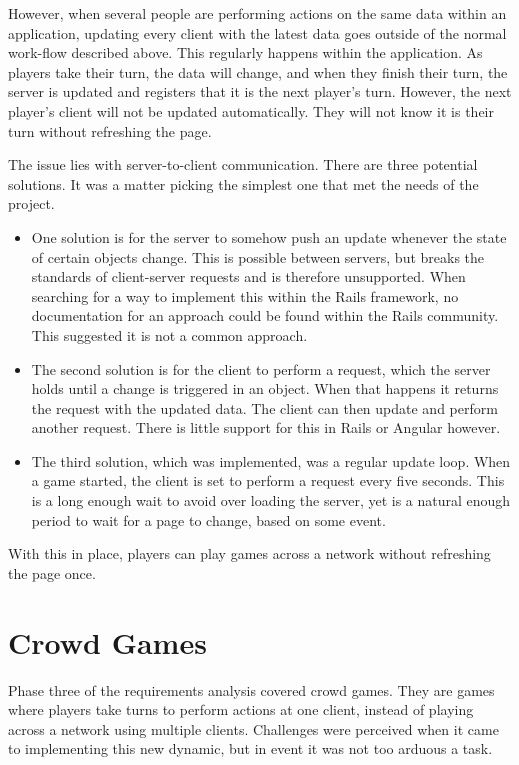 However, when several people are performing actions on the same data within an application, updating every client with the latest data goes outside of the normal work-flow described above. This regularly happens within the application. As players take their turn, the data will change, and when they finish their turn, the server is updated and registers that it is the next player's turn. However, the next player's client will not be updated automatically. They will not know it is their turn without refreshing the page.

The issue lies with server-to-client communication. There are three potential solutions. It was a matter picking the simplest one that met the needs of the project.
\begin{itemize}
	\item One solution is for the server to somehow push an update whenever the state of certain objects change. This is possible between servers, but breaks the standards of client-server requests and is therefore unsupported. When searching for a way to implement this within the Rails framework, no documentation for an approach could be found within the Rails community. This suggested it is not a common approach.

	\item The second solution is for the client to perform a request, which the server holds until a change is triggered in an object. When that happens it returns the request with the updated data. The client can then update and perform another request. There is little support for this in Rails or Angular however.

	\item The third solution, which was implemented, was a regular update loop. When a game started, the client is set to perform a request every five seconds. This is a long enough wait to avoid over loading the server, yet is a natural enough period to wait for a page to change, based on some event.
\end{itemize}

With this in place, players can play games across a network without refreshing the page once.

\section{Crowd Games}
Phase three of the requirements analysis covered crowd games. They are games where players take turns to perform actions at one client, instead of playing across a network using multiple clients. Challenges were perceived when it came to implementing this new dynamic, but in event it was not too arduous a task.

